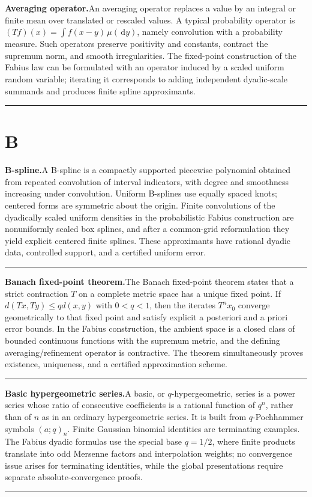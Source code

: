 \documentclass[11pt,oneside]{article}
\newcommand{\dd}{\,\mathrm d}
\newcommand{\glossaryentry}[3]{%
  \par\addvspace{0.95\baselineskip}%
  \phantomsection\hypertarget{gls:#1}{}%
  \noindent\textbf{\large #2.}\enspace #3\par
  \nopagebreak[2]\vspace{0.15\baselineskip}%
  \noindent\color{rulegray}\rule{\linewidth}{0.25pt}\color{black}%
}
\begin{document}
\glossaryentry{averaging-operator}{Averaging operator}{An averaging operator replaces a value by an integral or finite mean over translated or rescaled values. A typical probability operator is \((Tf)(x)=\int f(x-y)\,\mu(\dd y)\), namely convolution with a probability measure. Such operators preserve positivity and constants, contract the supremum norm, and smooth irregularities. The fixed-point construction of the Fabius law can be formulated with an operator induced by a scaled uniform random variable; iterating it corresponds to adding independent dyadic-scale summands and produces finite spline approximants.}
\section{B}\label{sec:letter-b}
\glossaryentry{b-spline}{B-spline}{A B-spline is a compactly supported piecewise polynomial obtained from repeated convolution of interval indicators, with degree and smoothness increasing under convolution. Uniform B-splines use equally spaced knots; centered forms are symmetric about the origin. Finite convolutions of the dyadically scaled uniform densities in the probabilistic Fabius construction are nonuniformly scaled box splines, and after a common-grid reformulation they yield explicit centered finite splines. These approximants have rational dyadic data, controlled support, and a certified uniform error.}
\glossaryentry{banach-fixed-point-theorem}{Banach fixed-point theorem}{The Banach fixed-point theorem states that a strict contraction \(T\) on a complete metric space has a unique fixed point. If \(d(Tx,Ty)\le qd(x,y)\) with \(0<q<1\), then the iterates \(T^n x_0\) converge geometrically to that fixed point and satisfy explicit a posteriori and a priori error bounds. In the Fabius construction, the ambient space is a closed class of bounded continuous functions with the supremum metric, and the defining averaging/refinement operator is contractive. The theorem simultaneously proves existence, uniqueness, and a certified approximation scheme.}
\glossaryentry{basic-hypergeometric-series}{Basic hypergeometric series}{A basic, or \(q\)-hypergeometric, series is a power series whose ratio of consecutive coefficients is a rational function of \(q^n\), rather than of \(n\) as in an ordinary hypergeometric series. It is built from \(q\)-Pochhammer symbols \((a;q)_n\). Finite Gaussian binomial identities are terminating examples. The Fabius dyadic formulas use the special base \(q=1/2\), where finite products translate into odd Mersenne factors and interpolation weights; no convergence issue arises for terminating identities, while the global presentations require separate absolute-convergence proofs.}
\end{document}
